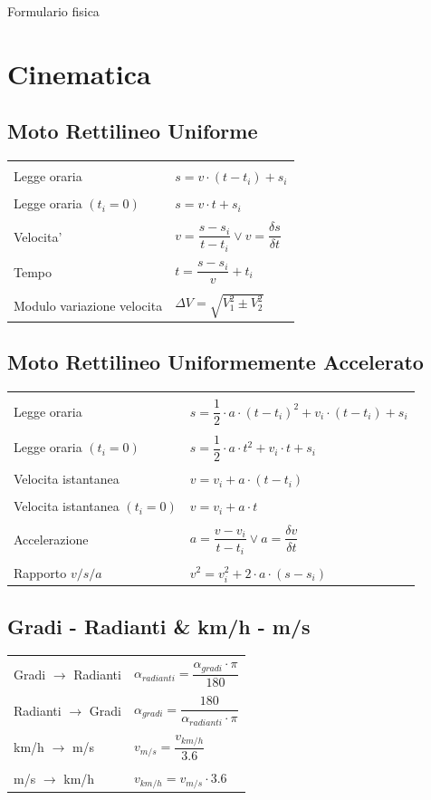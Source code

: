 \documentclass[11pt]{article}
\def\nt{\\[3mm]\hline\\[-2mm]}
\def\nnt{\hline\\[-2mm]}
\def\tnn{\\[2mm]\hline}
\begin{document}
\begin{center}{\huge{Formulario fisica}}
\end{center}

\section{Cinematica}

\subsection{Moto Rettilineo Uniforme}

\begin{tabular}{| p{9.5cm} | p{9.5cm} |}
	\nnt
	Legge oraria & \texttt{$s = v \cdot (t - t_i) + s_i$} \nt
	Legge oraria $(t_i = 0)$ & \texttt{$s = v \cdot t + s_i$} \nt
	Velocita' & \texttt{$v = \dfrac{s - s_i}{t - t_i} \lor v = \dfrac{\delta s}{\delta t}$} \nt
	Tempo & \texttt{$t = \dfrac{s - s_i}{v} + t_i$} \nt
	Modulo variazione velocita & \texttt{$\Delta V = \sqrt{V_1^2 \pm V_2^2}$} \tnn
	
\end{tabular}

\subsection{Moto Rettilineo Uniformemente Accelerato}

\begin{tabular}{| p{9.5cm} | p{9.5cm} |}
	\nnt
	Legge oraria & \texttt{$s = \dfrac12 \cdot a \cdot (t - t_i)^2 + v_i \cdot (t - t_i) + s_i$} \nt
	Legge oraria $(t_i = 0)$ & \texttt{$s = \dfrac12 \cdot a \cdot t^2 + v_i \cdot t + s_i$} \nt
	Velocita istantanea & \texttt{$v = v_i + a \cdot (t - t_i)$} \nt
	Velocita istantanea $(t_i = 0) $& \texttt{$v = v_i + a \cdot t$} \nt
	Accelerazione & \texttt{$a = \dfrac{v - v_i}{t - t_i} \lor a = \dfrac{\delta v}{\delta t}$} \nt
	Rapporto $v/s/a$ & \texttt{$v^2 = v_i^2 + 2 \cdot a \cdot (s - s_i)$} \tnn 

\end{tabular}

\subsection{Gradi - Radianti \& km/h - m/s}

\begin{tabular}{| p{9.5cm} | p{9.5cm} |}
	\nnt
	Gradi $\rightarrow$ Radianti & \texttt{$\alpha_{radianti} = \dfrac{\alpha_{gradi} \cdot \pi}{180}$} \nt
    Radianti $\rightarrow$ Gradi & \texttt{$\alpha_{gradi} = \dfrac{180}{\alpha_{radianti} \cdot \pi}$} \nt
    km/h $\rightarrow$ m/s & \texttt{$v_{m/s} = \dfrac{v_{km/h}}{3.6}$} \nt
    m/s $\rightarrow$ km/h & \texttt{$v_{km/h} = v_{m/s} \cdot 3.6$} \tnn
\end{tabular}
\end{document}
